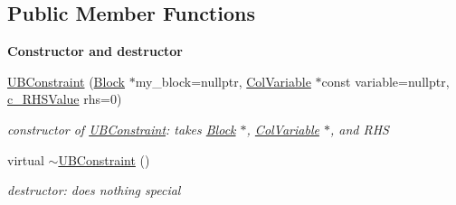 \subsection*{Public Member Functions}
\begin{Indent}\textbf{ Constructor and destructor}\par
\begin{DoxyCompactItemize}
\item 
\mbox{\hyperlink{class_s_m_spp__di__unipi__it_1_1_u_b_constraint_ad5071f2d637a23769ab748c14d24c041}{U\+B\+Constraint}} (\mbox{\hyperlink{class_s_m_spp__di__unipi__it_1_1_block}{Block}} $\ast$my\+\_\+block=nullptr, \mbox{\hyperlink{class_s_m_spp__di__unipi__it_1_1_col_variable}{Col\+Variable}} $\ast$const variable=nullptr, \mbox{\hyperlink{class_s_m_spp__di__unipi__it_1_1_row_constraint_a34abd4b01d3a2024be5f6d13dd88779f}{c\+\_\+\+R\+H\+S\+Value}} rhs=0)
\begin{DoxyCompactList}\small\item\em constructor of \mbox{\hyperlink{class_s_m_spp__di__unipi__it_1_1_u_b_constraint}{U\+B\+Constraint}}\+: takes \mbox{\hyperlink{class_s_m_spp__di__unipi__it_1_1_block}{Block}} $\ast$, \mbox{\hyperlink{class_s_m_spp__di__unipi__it_1_1_col_variable}{Col\+Variable}} $\ast$, and R\+HS \end{DoxyCompactList}\item 
\mbox{\label{class_s_m_spp__di__unipi__it_1_1_u_b_constraint_a15f64bcf77a4bcde59ae7b282c1147ea}} 
virtual \mbox{\hyperlink{class_s_m_spp__di__unipi__it_1_1_u_b_constraint_a15f64bcf77a4bcde59ae7b282c1147ea}{$\sim$\+U\+B\+Constraint}} ()
\begin{DoxyCompactList}\small\item\em destructor\+: does nothing special \end{DoxyCompactList}\end{DoxyCompactItemize}
\end{Indent}
